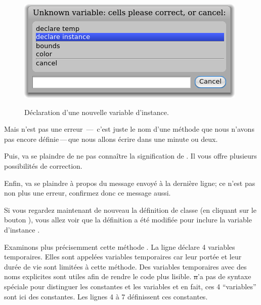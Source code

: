 \documentclass[a4paper,10pt,twoside]{book}
\begin{document}
\begin{figure}[htb]
\begin{minipage}{0.48\textwidth}
		{\includegraphics[scale=0.7]{DeclareInstanceVar}}
	\caption{Déclaration d'une nouvelle variable d'instance.}
\end{minipage}
\end{figure}

Mais  n'est pas une erreur \,---\, c'est juste le nom d'une méthode que nous n'avons pas encore définie\,---\,que nous allons écrire dans une minute ou deux.


Puis, \pharo va se plaindre de ne pas connaître la signification de . Il vous offre plusieurs possibilités de correction.

Enfin, \pharo va se plaindre à propos du message 
envoyé à la dernière ligne; ce n'est pas non plus une erreur,
confirmez donc ce message aussi.

Si vous regardez maintenant de nouveau la définition de classe (en cliquant sur le bouton ), vous allez voir que la définition a été modifiée pour inclure la variable d'instance .

Examinons plus précisemment cette méthode .
La ligne \mbox{} déclare 4 variables temporaires. Elles sont appelées variables temporaires car leur portée et leur durée de vie sont limitées à cette méthode. Des variables temporaires avec des noms explicites sont utiles afin de rendre le code plus lisible. \st n'a pas de syntaxe spéciale pour distinguer les constantes et les variables et en fait, ces 4 ``variables'' sont ici des constantes. Les lignes 4 à 7 définissent ces constantes.
\end{document}
